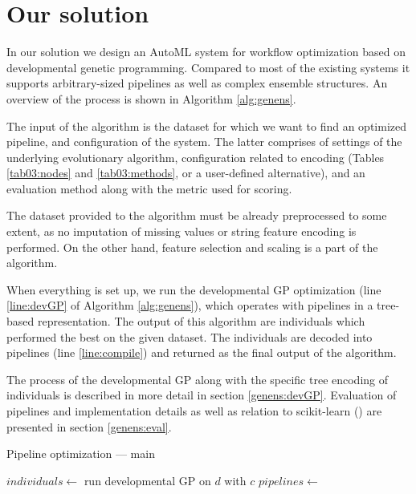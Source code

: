 \chapter{Our solution} \label{our:solution}

In our solution we design an AutoML system for workflow optimization based on
developmental genetic programming. Compared to most of the existing systems it supports 
arbitrary-sized pipelines as well as complex ensemble structures. An overview
of the process is shown in Algorithm \ref{alg:genens}.

The input of the
algorithm is the dataset for which we want to find an optimized pipeline, and
configuration of the system. The latter comprises of settings of the
underlying evolutionary algorithm, configuration related to encoding (Tables
\ref{tab03:nodes} and \ref{tab03:methods}, or a user-defined alternative), and an
evaluation method along with the metric used for scoring.

The dataset provided to the algorithm must be already preprocessed to some
extent, as no imputation of missing values or string feature encoding is
performed. On the other hand, feature selection and scaling is a part of
the algorithm.

When everything is set up, we run the developmental GP optimization
(line \ref{line:devGP} of Algorithm \ref{alg:genens}), which operates with pipelines in a tree-based
representation. The output of this algorithm are individuals which
performed the best on the given dataset. The individuals are decoded into
pipelines (line \ref{line:compile}) and returned as the final output of the
algorithm.

The process of the developmental GP along with the specific tree encoding of
individuals is described in more detail in section \ref{genens:devGP}. 
Evaluation of pipelines and implementation details as well as relation to
scikit-learn (\cite{scikit-learn}) are presented in section \ref{genens:eval}.

\begin{algorithm}
\DontPrintSemicolon 
\caption{Pipeline optimization --- main\label{alg:genens}}
  \;
  $individuals \longleftarrow$ run developmental GP on $d$ with $c$ \label{line:devGP} \;
  $pipelines \longleftarrow$  \label{line:compile}
  \;\;
  
\end{algorithm}



